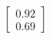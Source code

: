 \documentclass[preview]{standalone}
\begin{document}
\begin{align*}
\begin{bmatrix} 0.92 \\ 0.69 \end{bmatrix}
\end{align*}
\end{document}
